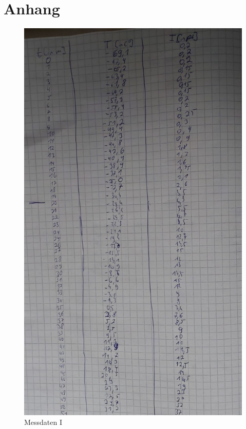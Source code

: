 \newpage
\section{Anhang}
\label{sec:anhang}
\begin{figure}[h!]
  \centering
  \includegraphics[scale=0.3]{fig/mess1.jpeg}
  \caption{Messdaten I}
  \label{abb:mess1}
\end{figure}
